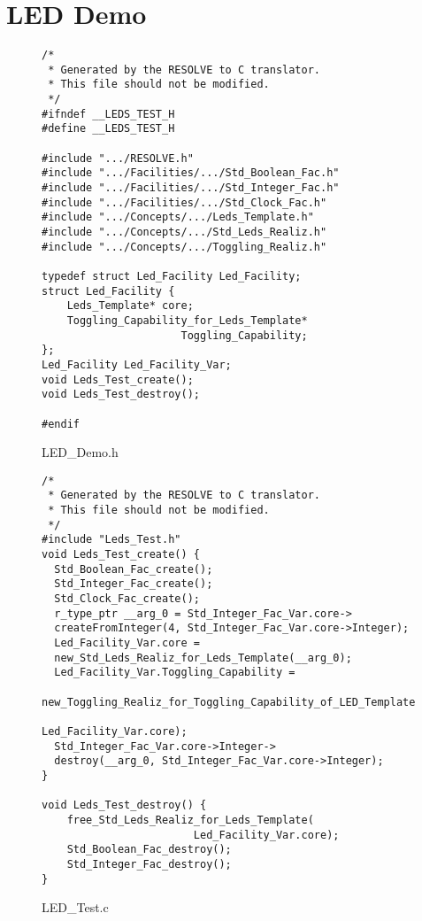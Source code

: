 \section{LED Demo}

\begin{figure}
\centering
\begin{verbatim}
/*
 * Generated by the RESOLVE to C translator. 
 * This file should not be modified.
 */
#ifndef __LEDS_TEST_H
#define __LEDS_TEST_H

#include ".../RESOLVE.h"
#include ".../Facilities/.../Std_Boolean_Fac.h"
#include ".../Facilities/.../Std_Integer_Fac.h"
#include ".../Facilities/.../Std_Clock_Fac.h"
#include ".../Concepts/.../Leds_Template.h"
#include ".../Concepts/.../Std_Leds_Realiz.h"
#include ".../Concepts/.../Toggling_Realiz.h"

typedef struct Led_Facility Led_Facility;
struct Led_Facility {
    Leds_Template* core;
    Toggling_Capability_for_Leds_Template* 
                      Toggling_Capability;
};
Led_Facility Led_Facility_Var;
void Leds_Test_create();
void Leds_Test_destroy();

#endif
\end{verbatim}
\caption{LED\_Demo.h}
\end{figure}

\begin{figure}
\centering
\begin{verbatim}
/*
 * Generated by the RESOLVE to C translator. 
 * This file should not be modified.
 */
#include "Leds_Test.h"
void Leds_Test_create() {
  Std_Boolean_Fac_create();
  Std_Integer_Fac_create();
  Std_Clock_Fac_create();
  r_type_ptr __arg_0 = Std_Integer_Fac_Var.core->
  createFromInteger(4, Std_Integer_Fac_Var.core->Integer);
  Led_Facility_Var.core = 
  new_Std_Leds_Realiz_for_Leds_Template(__arg_0);
  Led_Facility_Var.Toggling_Capability = 
  new_Toggling_Realiz_for_Toggling_Capability_of_LED_Template(
								      Led_Facility_Var.core);
  Std_Integer_Fac_Var.core->Integer->
  destroy(__arg_0, Std_Integer_Fac_Var.core->Integer);
}

void Leds_Test_destroy() {
    free_Std_Leds_Realiz_for_Leds_Template(
    				    Led_Facility_Var.core);
    Std_Boolean_Fac_destroy();
    Std_Integer_Fac_destroy();
}
\end{verbatim}
\caption{LED\_Test.c}
\end{figure}
